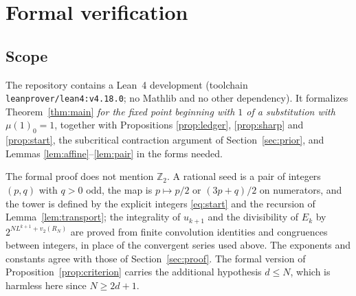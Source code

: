\documentclass[11pt,reqno]{amsart}
\theoremstyle{definition}
\theoremstyle{remark}
\newcommand{\Zt}{\mathbb{Z}_2}
\newcommand{\vt}{v_2}
\begin{document}
\section{Formal verification}\label{sec:formal}

\subsection{Scope}
The repository \cite{Repo} contains a Lean~4 development (toolchain
\texttt{leanprover/lean4:v4.18.0}; no Mathlib and no other dependency).
It formalizes Theorem~\ref{thm:main} \emph{for the fixed point beginning
with $1$ of a substitution with $\mu(1)_0=1$}, together with Propositions
\ref{prop:ledger}, \ref{prop:sharp} and \ref{prop:start}, the subcritical
contraction argument of Section~\ref{sec:prior}, and Lemmas
\ref{lem:affine}--\ref{lem:pair} in the forms needed.

The formal proof does not mention $\Zt$.  A rational seed is a pair of
integers $(p,q)$ with $q>0$ odd, the map is
$p\mapsto p/2$ or $(3p+q)/2$ on numerators, and the tower is defined by the
explicit integers \eqref{eq:start} and the recursion of
Lemma~\ref{lem:transport}; the integrality of $u_{k+1}$ and the
divisibility of $E_k$ by $2^{NL^{k+1}+\vt(R_N)}$ are proved from finite
convolution identities and congruences between integers, in place of the
convergent series used above.  The exponents and constants agree with
those of Section~\ref{sec:proof}.  The formal version of
Proposition~\ref{prop:criterion} carries the additional hypothesis
$d\le N$, which is harmless here since $N\ge 2d+1$.
\end{document}
